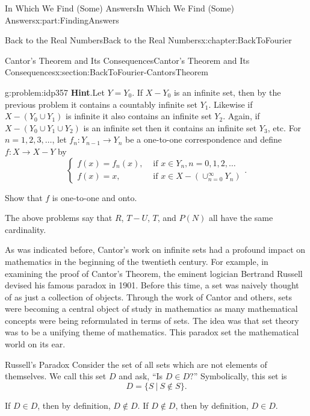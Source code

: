 \documentclass[oneside,10pt,]{book}
\newcommand{\blocktitlefont}{\relax}
\numberwithin{equation}{section}
\newcommand{\amp}{&}
\begin{document}
\begin{partptx}{In Which We Find (Some) Answers}{}{In Which We Find (Some) Answers}{}{}{x:part:FindingAnswers}
\begin{chapterptx}{Back to the Real Numbers}{}{Back to the Real Numbers}{}{}{x:chapter:BackToFourier}
\begin{sectionptx}{Cantor's Theorem and Its Consequences}{}{Cantor's Theorem and Its Consequences}{}{}{x:section:BackToFourier-CantorsTheorem}
\begin{problem}{}{g:problem:idp357}
\noindent\textbf{\blocktitlefont Hint}.\hypertarget{g:hint:idp358}{}\quad{}Let \(Y=Y_0\). If \(X-Y_0\) is an infinite set, then by the previous problem it contains a countably infinite set \(Y_1\). Likewise if \(X-(Y_0\cup Y_1)\) is infinite it also contains an infinite set \(Y_2\). Again, if \(X-(Y_0\cup Y_1\cup Y_2)\) is an infinite set then it contains an infinite set \(Y_3\), etc. For \(n=1, 2, 3,\ldots \), let \(f_n:Y_{n-1}\rightarrow Y_n\) be a one-to-one correspondence and define \(f:X\rightarrow X-Y\) by%
\begin{equation*}
\begin{cases}f(x)=f_n(x), \amp \text{ if }  x\in Y_n, n=0,1,2,\ldots\\ f(x)=x, \amp \text{ if }  x\in X-(\cup_{n=0}^\infty Y_n ) \end{cases} \text{.}
\end{equation*}
%
\par
Show that \(f\) is one-to-one and onto.%
\end{problem}
The above problems say that \(R\), \(T-U\), \(T\), and \(P(N)\) all have the same cardinality.%
\par
As was indicated before, Cantor's  work on infinite sets had a profound impact on mathematics in the beginning of the twentieth century. For example, in examining the proof of Cantor's Theorem, the eminent logician Bertrand Russell devised his famous paradox in 1901. Before this time, a set was naively thought of as just a collection of objects. Through the work of Cantor and others, sets were becoming a central object of study in mathematics as many mathematical concepts were being reformulated in terms of sets. The idea was that set theory was to be a unifying theme of mathematics. This paradox set the mathematical world on its ear.%
\par
\textbraceleft{}Russell's Paradox\textbraceright{}  Consider the set of all sets which are not elements of themselves. We call this set \(D\) and ask, ``Is \(D\in D?\)'' Symbolically, this set is%
\begin{equation*}
D=\{S\ |\ S\not \in S\}\text{.}
\end{equation*}
%
\par
If \(D\in D\), then by definition, \(D\not\in D\). If \(D\not\in D\), then by definition, \(D\in D\).%
\par

\end{sectionptx}
\end{chapterptx}
\end{partptx}
\end{document}
